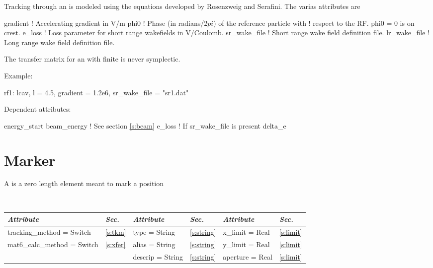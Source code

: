 Tracking through an  is modeled using the equations developed by Rosenzweig
and Serafini\cite{b:rosenzweig}. The varias attributes are
\begin{example}
  gradient     ! Accelerating gradient in V/m
  phi0         ! Phase (in radians/2$pi$) of the reference particle with 
               !   respect to the RF. phi0 = 0 is on crest.
  e_loss       ! Loss parameter for short range wakefields in V/Coulomb.
  sr_wake_file ! Short range wake field definition file.
  lr_wake_file ! Long range wake field definition file.
\end{example}

The transfer matrix for an  with finite  is never symplectic.

\vskip0.05in \noindent
Example:
\begin{example}
  rf1: lcav, l = 4.5, gradient = 1.2e6, sr\_wake\_file = "sr1.dat"
\end{example}

\vskip0.05in \noindent
Dependent attributes:
\begin{example}
  energy\_start
  beam\_energy  ! See section \ref{s:beam}
  e\_loss       ! If sr\_wake\_file is present
  delta\_e
\end{example}

\section{Marker}
\label{s:mark}

A  is a zero length element meant to mark a position

\toffset
\begin{center}
\tt
\begin{tabular}{|l|l||l|l||l|l|} \hline
  {\sl Attribute} & {\sl Sec.}  & {\sl Attribute} & {\sl Sec.} & {\sl Attribute} & {\sl Sec.} \\ \hline
  tracking\_method = Switch    & \ref{s:tkm}  &  type = String      & \ref{s:string} & x\_limit = Real  & \ref{s:limit} \\ \hline 
  mat6\_calc\_method = Switch  & \ref{s:xfer} &  alias = String     & \ref{s:string} & y\_limit = Real  & \ref{s:limit} \\ \hline 
                               &              &  descrip = String   & \ref{s:string} & aperture = Real  & \ref{s:limit} \\ \hline 
\end{tabular}
\end{center}
\toffset

